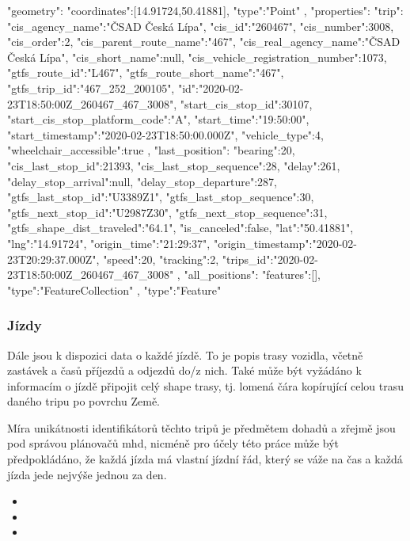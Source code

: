 \begin{code}[frame=none]
"geometry":{
  "coordinates":[14.91724,50.41881],
  "type":"Point"
},
"properties":{
  "trip":{
    "cis_agency_name":"ČSAD Česká Lípa",
	"cis_id":"260467",
	"cis_number":3008,
	"cis_order":2,
	"cis_parent_route_name":"467",
	"cis_real_agency_name":"ČSAD Česká Lípa",
	"cis_short_name":null,
	"cis_vehicle_registration_number":1073,
	"gtfs_route_id":"L467",
	"gtfs_route_short_name":"467",
	"gtfs_trip_id":"467_252_200105",
	"id":"2020-02-23T18:50:00Z_260467_467_3008",
	"start_cis_stop_id":30107,
	"start_cis_stop_platform_code":"A",
	"start_time":"19:50:00",
	"start_timestamp":"2020-02-23T18:50:00.000Z",
	"vehicle_type":4,
	"wheelchair_accessible":true
  },
  "last_position":{
    "bearing":20,
	"cis_last_stop_id":21393,
	"cis_last_stop_sequence":28,
	"delay":261,
	"delay_stop_arrival":null,
	"delay_stop_departure":287,
	"gtfs_last_stop_id":"U3389Z1",
	"gtfs_last_stop_sequence":30,
	"gtfs_next_stop_id":"U2987Z30",
	"gtfs_next_stop_sequence":31,
	"gtfs_shape_dist_traveled":"64.1",
	"is_canceled":false,
	"lat":"50.41881",
	"lng":"14.91724",
	"origin_time":"21:29:37",
	"origin_timestamp":"2020-02-23T20:29:37.000Z",
	"speed":20,
	"tracking":2,
	"trips_id":"2020-02-23T18:50:00Z_260467_467_3008"
	},
  "all_positions":{
    "features":[],
	"type":"FeatureCollection"
  }
},
"type":"Feature"

\end{code}

\subsubsection{Jízdy}

Dále jsou k dispozici data o každé jízdě. To je popis trasy vozidla, včetně zastávek a časů příjezdů a odjezdů do/z nich. Také může být vyžádáno k informacím o jízdě připojit celý shape trasy, tj. lomená čára kopírující celou trasu daného tripu po povrchu Země.

\bigbreak

 Míra unikátnosti identifikátorů těchto tripů je předmětem dohadů a zřejmě jsou pod správou plánovačů \gls{mhd}, nicméně pro účely této práce může být předpokládáno, že každá jízda má vlastní jízdní řád, který se váže na čas a každá jízda jede nejvýše jednou za den.

\begin{itemize}
	\item {}

	\item {}

	\item {}


\end{itemize}

